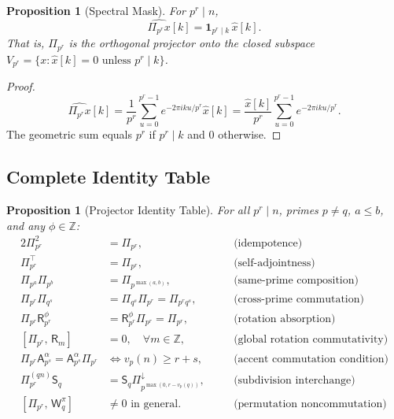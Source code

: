 \documentclass[11pt]{amsart}
\newtheorem{proposition}[theorem]{Proposition}
\newcommand{\Prj}{\Pi}
\newcommand{\Sp}{\mathsf{S}}
\newcommand{\Ap}{\mathsf{A}}
\newcommand{\Rp}{\mathsf{R}}
\newcommand{\Wp}{\mathsf{W}}
\newcommand{\vp}{v_p}
\newcommand{\Z}{\mathbb{Z}}
\begin{document}
\begin{proposition}[Spectral Mask]\label{prop:spectral-mask}
For $p^r \mid n$,
\[
  \widehat{\Prj_{p^r} x}[k] = \mathbf{1}_{p^r \mid k}\, \hat{x}[k].
\]
That is, $\Prj_{p^r}$ is the orthogonal projector onto the closed subspace $V_{p^r} = \{x : \hat{x}[k] = 0 \text{ unless } p^r \mid k\}$.
\end{proposition}

\begin{proof}
\[
  \widehat{\Prj_{p^r} x}[k] = \frac{1}{p^r}\sum_{u=0}^{p^r-1} e^{-2\pi i k u / p^r} \hat{x}[k] = \frac{\hat{x}[k]}{p^r} \sum_{u=0}^{p^r - 1} e^{-2\pi i k u / p^r}.
\]
The geometric sum equals $p^r$ if $p^r \mid k$ and $0$ otherwise.
\end{proof}

\subsection{Complete Identity Table}

\begin{proposition}[Projector Identity Table]\label{prop:id-table}
For all $p^r \mid n$, primes $p \neq q$, $a \leq b$, and any $\phi \in \Z$:
\begin{alignat}{2}
  \Prj_{p^r}^2 &= \Prj_{p^r}, &\quad& \text{(idempotence)} \label{id:idem}\\
  \Prj_{p^r}^\top &= \Prj_{p^r}, &\quad& \text{(self-adjointness)} \label{id:sa}\\
  \Prj_{p^a}\Prj_{p^b} &= \Prj_{p^{\max(a,b)}}, &\quad& \text{(same-prime composition)} \label{id:same}\\
  \Prj_{p^r}\Prj_{q^s} &= \Prj_{q^s}\Prj_{p^r} = \Prj_{p^r q^s}, &\quad& \text{(cross-prime commutation)} \label{id:cross}\\
  \Prj_{p^r} \Rp_{p^r}^\phi &= \Rp_{p^r}^\phi \Prj_{p^r} = \Prj_{p^r}, &\quad& \text{(rotation absorption)} \label{id:rot}\\
  [\Prj_{p^r},\, \Rp_m] &= 0, \quad \forall m \in \Z, &\quad& \text{(global rotation commutativity)} \label{id:rotcomm}\\
  \Prj_{p^r} \Ap^\alpha_{p^s} = \Ap^\alpha_{p^s}\Prj_{p^r} &\iff \vp(n) \geq r+s, &\quad& \text{(accent commutation condition)} \label{id:accent}\\
  \Prj^{(qn)}_{p^r} \Sp_q &= \Sp_q \Prj^\downarrow_{p^{\max(0,r-\vp(q))}}, &\quad& \text{(subdivision interchange)} \label{id:subdiv}\\
  [\Prj_{p^r},\, \Wp^\pi_q] &\neq 0 \text{ in general.} &\quad& \text{(permutation noncommutation)} \label{id:perm}
\end{alignat}
\end{proposition}
\end{document}

